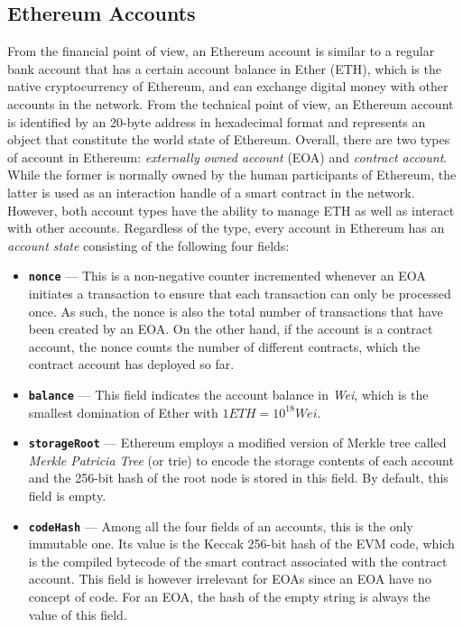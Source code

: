 \subsection{Ethereum Accounts} \label{subsec:eth_acc}

From the financial point of view, an Ethereum account is similar to a regular bank account that has a certain account balance in Ether (ETH), which is the native cryptocurrency of Ethereum, and can exchange digital money with other accounts in the network. From the technical point of view, an Ethereum account is identified by an 20-byte address in hexadecimal format and represents an object that constitute the world state of Ethereum. Overall, there are two types of account in Ethereum: \textit{externally owned account} (EOA) and \textit{contract account}. While the former is normally owned by the human participants of Ethereum, the latter is used as an interaction handle of a smart contract in the network. However, both account types have the ability to manage ETH as well as interact with other accounts. Regardless of the type, every account in Ethereum has an \textit{account state} consisting of the following four fields: 

\begin{itemize}
	\item \textbf{\texttt{nonce}} --- This is a non-negative counter incremented whenever an EOA initiates a transaction to ensure that each transaction can only be processed once. As such, the nonce is also the total number of transactions  that have been created by an EOA. On the other hand, if the account is a contract account, the nonce counts the number of different contracts, which the contract account has deployed so far.

	\item \textbf{\texttt{balance}} --- This field indicates the account balance in \textit{Wei}, which is the smallest domination of Ether with $1 ETH = 10^{18} Wei$.

	\item \textbf{\texttt{storageRoot}} --- Ethereum employs a modified version of Merkle tree called \textit{Merkle Patricia Tree} (or trie) \cite{wood2014ethereum} to encode the storage contents of each account and the 256-bit hash of the root node is stored in this field. By default, this field is empty.

	\item \textbf{\texttt{codeHash}} --- Among all the four fields of an accounts, this is the only immutable one. Its value is the Keccak 256-bit hash of the EVM code, which is the compiled bytecode of the smart contract associated with the contract account. This field is however irrelevant for EOAs since an EOA have no concept of code. For an EOA, the hash of the empty string is always the value of this field.

\end{itemize}


